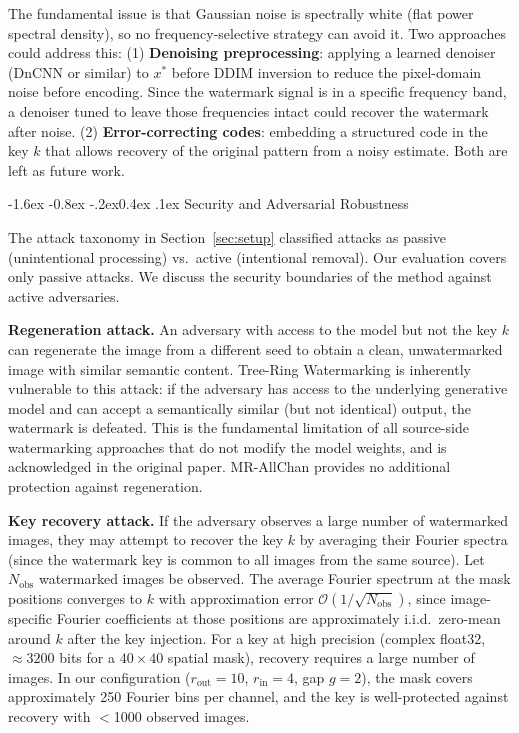 \documentclass[10pt,twocolumn]{article}
\makeatletter
\renewcommand\subsection{\@startsection{subsection}{2}{\z@}%
  {-1.6ex \@plus -0.8ex \@minus -.2ex}{0.4ex \@plus .1ex}%
  {\normalfont\normalsize\itshape}}
\makeatother
\begin{document}
The fundamental issue is that Gaussian noise is spectrally white
(flat power spectral density), so no frequency-selective strategy
can avoid it.
Two approaches could address this:
(1) \textbf{Denoising preprocessing}: applying a learned denoiser
(DnCNN or similar) to $x^*$ before DDIM inversion to reduce the
pixel-domain noise before encoding.
Since the watermark signal is in a specific frequency band, a
denoiser tuned to leave those frequencies intact could recover
the watermark after noise.
(2) \textbf{Error-correcting codes}: embedding a structured code
in the key $k$ that allows recovery of the original pattern from
a noisy estimate.
Both are left as future work.

\subsection{Security and Adversarial Robustness}
\label{sec:security}

The attack taxonomy in Section~\ref{sec:setup} classified attacks
as passive (unintentional processing) vs.\ active (intentional removal).
Our evaluation covers only passive attacks.
We discuss the security boundaries of the method against active adversaries.

\textbf{Regeneration attack.}
An adversary with access to the model but not the key $k$ can regenerate
the image from a different seed to obtain a clean, unwatermarked image
with similar semantic content.
Tree-Ring Watermarking is inherently vulnerable to this attack: if the
adversary has access to the underlying generative model and can accept
a semantically similar (but not identical) output, the watermark is
defeated.
This is the fundamental limitation of all source-side watermarking
approaches that do not modify the model weights, and is acknowledged
in the original paper.
MR-AllChan provides no additional protection against regeneration.

\textbf{Key recovery attack.}
If the adversary observes a large number of watermarked images, they
may attempt to recover the key $k$ by averaging their Fourier spectra
(since the watermark key is common to all images from the same source).
Let $N_{\mathrm{obs}}$ watermarked images be observed.
The average Fourier spectrum at the mask positions converges to $k$ with
approximation error $\mathcal{O}(1/\sqrt{N_{\mathrm{obs}}})$, since
image-specific Fourier coefficients at those positions are approximately
i.i.d.\ zero-mean around $k$ after the key injection.
For a key at high precision (complex float32, $\approx 3200$ bits for
a $40{\times}40$ spatial mask), recovery requires a large number of
images.
In our configuration ($r_{\mathrm{out}}{=}10$, $r_{\mathrm{in}}{=}4$,
gap $g{=}2$), the mask covers approximately 250 Fourier bins per channel,
and the key is well-protected against recovery with $<$1000 observed images.
\end{document}
